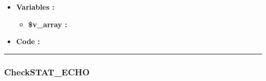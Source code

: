 \documentclass[a4paper,10pt]{article}
\begin{document}
\begin{itemize}
    \item \textbf{Variables :}
    \begin{itemize}
        \item \textbf{\color{orange}\$v\_array\color{white} :}\\[1\baselineskip]
    \end{itemize}


    \item \textbf{Code :}
\end{itemize}


\color{blue}\par\noindent\rule{\textwidth}{0.4pt}\color{white}

\color{blue}
\subsubsection{CheckSTAT\_ECHO}\color{white}
\end{document}
